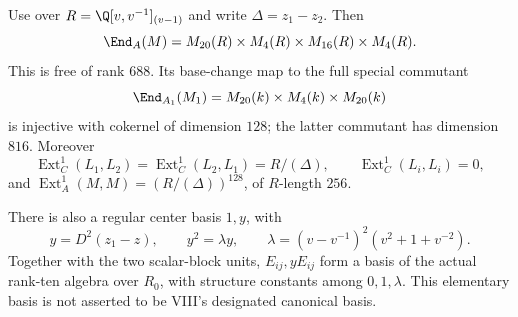 \begin{finding}\label{f:r3deformation}
Use  over $R=\Q[v,v^{-1}]_{(v-1)}$ and write
$\Delta=z_1-z_2$. Then
\[
 \End_A(M)=M_{20}(R)\times M_4(R)\times M_{16}(R)\times M_4(R).
\]
This is free of rank $688$. Its base-change map to the full special
commutant
\[
 \End_{A_1}(M_1)=M_{20}(k)\times M_4(k)\times M_{20}(k)
\]
is injective with cokernel of dimension $128$; the latter commutant has
dimension $816$. Moreover
\[
 \operatorname{Ext}^1_C(L_1,L_2)
 =\operatorname{Ext}^1_C(L_2,L_1)=R/(\Delta),\qquad
 \operatorname{Ext}^1_C(L_i,L_i)=0,
\]
and $\operatorname{Ext}^1_A(M,M)=(R/(\Delta))^{128}$, of $R$-length $256$.

There is also a regular center basis $1,y$, with
\begin{equation}\label{eq:r3basis}
 y=D^2(z_1-z),\qquad
 y^2=\lambda y,\qquad
 \lambda=(v-v^{-1})^2(v^2+1+v^{-2}).
\end{equation}
Together with the two scalar-block units, $E_{ij},yE_{ij}$ form a basis
of the actual rank-ten algebra over $R_0$, with structure constants
among $0,1,\lambda$. This elementary basis is not asserted to be VIII's
designated canonical basis.
\end{finding}
